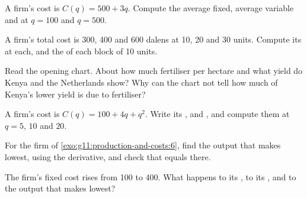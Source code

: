 \begin{exercise}[$\star$]\label{exo:g11:production-and-costs:3}
A firm's cost is $C(q) = 500 + 3q$. Compute the average fixed, average variable and  at $q = 100$ and $q = 500$.
\end{exercise}

\begin{exercise}[$\star$]\label{exo:g11:production-and-costs:4}
A firm's total cost is 300, 400 and 600 dalens at 10, 20 and 30 units. Compute its  at each, and the  of each block of 10 units.
\end{exercise}

\begin{exercise}[$\star$]\label{exo:g11:production-and-costs:5}
Read the opening chart. About how much fertiliser per hectare and what yield do Kenya and the Netherlands show? Why can the chart not tell how much of Kenya's lower
yield is due to fertiliser?
\end{exercise}

\begin{exercise}[$\star\star$]\label{exo:g11:production-and-costs:6}
A firm's cost is $C(q) = 100 + 4q + q^2$. Write its ,  and , and compute them at $q = 5$, $10$ and $20$.
\end{exercise}

\begin{exercise}[$\star\star$]\label{exo:g11:production-and-costs:7}
For the firm of \cref{exo:g11:production-and-costs:6}, find the output that makes  lowest, using the derivative, and check that 
equals  there.
\end{exercise}

\begin{exercise}[$\star\star$]\label{exo:g11:production-and-costs:8}
The firm's fixed cost rises from 100 to 400. What happens to its , to its , and to the output that makes  lowest?
\end{exercise}

